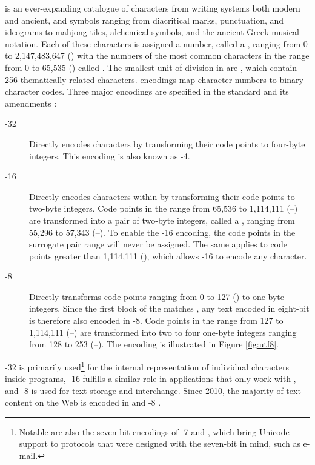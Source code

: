 \documentclass{book}
\begin{document}
 is an ever-expanding catalogue of characters from writing systems
both modern and ancient, and symbols ranging from diacritical marks,
punctuation, and ideograms to mahjong tiles, alchemical symbols, and the ancient
Greek musical notation. Each of these characters is assigned a number, called
a , ranging from 0 to 2,147,483,647 () with the
numbers of the most common characters in the range from 0 to 65,535
() called . The smallest unit of division in
 are , which contain 256
thematically related characters.  encodings map character numbers
to binary character codes. Three major encodings are specified in the
 standard and its amendments \cite{iso93:am1,iso93:am2}:
\begin{description}
  \item[-32]
    Directly encodes  characters by transforming their code points
    to four-byte integers. This encoding is also known as
    -4.
  \item[-16]
    Directly encodes characters within  by transforming their code
    points to two-byte integers. Code points in the range from 65,536 to
    1,114,111 (\mbox{--}) are transformed into a pair
    of two-byte integers, called a , ranging from
    55,296 to 57,343 (\mbox{--}). To enable the
    -16 encoding, the code points in the surrogate pair range
    will never be assigned. The same applies to code points greater than
    1,114,111 (), which allows -16 to encode any
     character.
  \item[-8]
    Directly transforms code points ranging from 0 to 127 () to one-byte
    integers. Since the first  block of the 
    matches , any text encoded in eight-bit  is
    therefore also encoded in -8. Code points in the range from
    127 to 1,114,111 (\mbox{--}) are transformed into
    two to four one-byte integers ranging from 128 to 253
    (\mbox{--}). The encoding is illustrated in Figure
    \ref{fig:utf8}.
\end{description}
-32 is primarily used\footnote{
  Notable are also the seven-bit encodings of -7
   and , which bring
  Unicode support to protocols that were designed with the seven-bit
   in mind, such as e-mail.}
for the internal representation of individual  characters inside
programs, -16 fulfills a similar role in applications that only
work with , and -8 is used for text storage and
interchange. Since 2010, the majority of text content on the Web is encoded in
 and -8 \cite{qsuccess15}.
\end{document}

